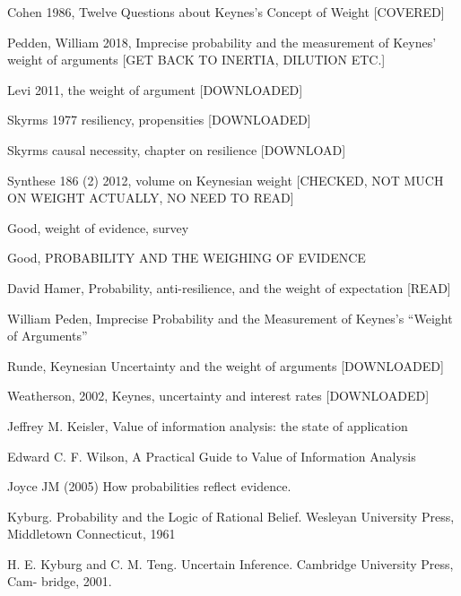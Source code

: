 \documentclass[
  10pt,
  dvipsnames,enabledeprecatedfontcommands]{scrartcl}
\begin{document}
Cohen 1986, Twelve Questions about Keynes's Concept of Weight
{[}COVERED{]}

Pedden, William 2018, Imprecise probability and the measurement of
Keynes' weight of arguments {[}GET BACK TO INERTIA, DILUTION ETC.{]}

Levi 2011, the weight of argument {[}DOWNLOADED{]}

Skyrms 1977 resiliency, propensities {[}DOWNLOADED{]}

Skyrms causal necessity, chapter on resilience {[}DOWNLOAD{]}

Synthese 186 (2) 2012, volume on Keynesian weight {[}CHECKED, NOT MUCH
ON WEIGHT ACTUALLY, NO NEED TO READ{]}

Good, weight of evidence, survey

Good, PROBABILITY AND THE WEIGHING OF EVIDENCE

David Hamer, Probability, anti-resilience, and the weight of expectation
{[}READ{]}

William Peden, Imprecise Probability and the Measurement of Keynes's
``Weight of Arguments''

Runde, Keynesian Uncertainty and the weight of arguments
{[}DOWNLOADED{]}

Weatherson, 2002, Keynes, uncertainty and interest rates
{[}DOWNLOADED{]}

Jeffrey M. Keisler, Value of information analysis: the state of
application

Edward C. F. Wilson, A Practical Guide to Value of Information Analysis

Joyce JM (2005) How probabilities reflect evidence.

Kyburg. Probability and the Logic of Rational Belief. Wesleyan
University Press, Middletown Connecticut, 1961

H. E. Kyburg and C. M. Teng. Uncertain Inference. Cambridge University
Press, Cam- bridge, 2001.
\end{document}
